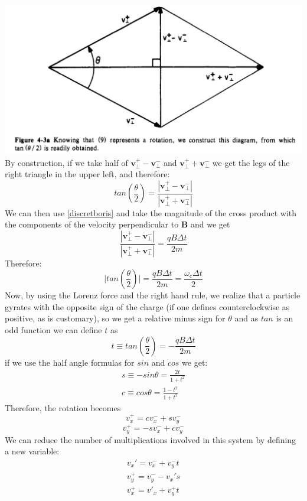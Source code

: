 \documentclass[12pt]{article}
\begin{document}
\hspace{-2cm}\includegraphics[scale=0.5]{anglerotated}
By construction, if we take half of $\textbf{v}^+_{\perp}-\textbf{v}^-_{\perp}$ and $\textbf{v}^+_{\perp}+\textbf{v}^-_{\perp}$ we get the legs of the right triangle in the upper left, and therefore:
$$tan\left(\frac{\theta}{2}\right)=\frac{|\textbf{v}^+_{\perp}-\textbf{v}^-_{\perp}|}{|\textbf{v}^+_{\perp}+\textbf{v}^-_{\perp}|}$$
We can then use \eqref{discretboris} and take the magnitude of the cross product with the components of the velocity perpendicular to $\textbf{B}$ and we get
$$\frac{|\textbf{v}^+_{\perp}-\textbf{v}^-_{\perp}|}{|\textbf{v}^+_{\perp}+\textbf{v}^-_{\perp}|}=\frac{qB\Delta t}{2m}$$
Therefore:
$$\bigg| tan\left(\frac{\theta}{2}\right)\bigg|=\frac{qB\Delta t}{2m}=\frac{\omega_c\Delta t}{2}$$
Now, by using the Lorenz force and the right hand rule, we realize that a particle gyrates with the opposite sign of the charge (if one defines counterclockwise as positive, as is customary), so we get a relative minus sign for $\theta$ and as $tan$ is an odd function we can define $t$ as
\begin{equation}\label{angleboris}
t\equiv tan\left(\frac{\theta}{2}\right)=-\frac{qB\Delta t}{2m}
\end{equation}
if we use the half angle formulas for $sin$ and $cos$ we get:
\begin{equation}\label{sandc}
\begin{split}
s\equiv -sin\theta =\frac{2t}{1+t^2}\\
c\equiv cos\theta=\frac{1-t^2}{1+t^2}
\end{split}
\end{equation}
Therefore, the rotation becomes
$$v_x^+=cv^-_x+sv^-_y$$
$$v_y^+=-sv^-_x+cv^-_y$$
We can reduce the number of multiplications involved in this system by defining a new variable:
\begin{equation}\label{Buneman}
\begin{split}
v_x'=v_x^-+v_y^-t\\
v_y^+=v_y^--v_x's\\
v_x^+=v'_x+v_y^+t
\end{split}
\end{equation} 
\end{document}
